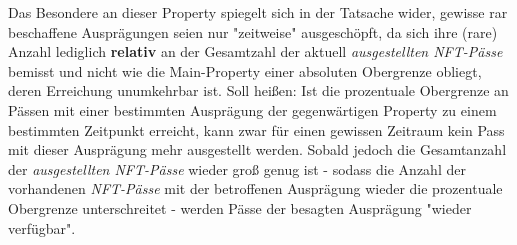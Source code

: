 \vspace{0.3cm}

Das Besondere an dieser Property spiegelt sich in der Tatsache wider, gewisse rar beschaffene Ausprägungen seien nur "zeitweise" ausgeschöpft, da sich ihre (rare) Anzahl lediglich \textbf{relativ} an der Gesamtzahl der aktuell \textit{ausgestellten NFT-Pässe} bemisst und nicht wie die Main-Property einer absoluten Obergrenze obliegt, deren Erreichung unumkehrbar ist. Soll heißen: Ist die prozentuale Obergrenze an Pässen mit einer bestimmten Ausprägung der gegenwärtigen Property zu einem be\-stimmten Zeitpunkt erreicht, kann zwar für einen gewissen Zeitraum kein Pass mit dieser Ausprägung mehr ausgestellt werden. Sobald jedoch die Gesamtanzahl der \textit{ausgestellten NFT-Pässe} wieder groß genug ist - sodass die Anzahl der vorhandenen \textit{NFT-Pässe} mit der betroffenen Ausprägung wieder die prozentuale Obergrenze unterschreitet - werden Pässe der besagten Ausprägung "wieder verfügbar".

\vspace{0.3cm}

